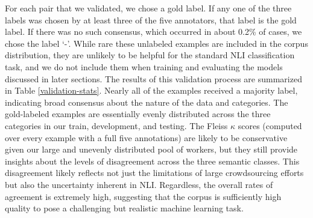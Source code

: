 For each pair that we validated, we chose a gold label. If any one of
the three labels was chosen by at least three of the five annotators,
that label is the gold label. If there was no such consensus, which
occurred in about 0.2\% of cases, we chose the label `-'. While rare these
unlabeled examples are included in the corpus distribution, they are
unlikely to be helpful for the standard NLI classification task, and
we do not include them when training and evaluating the models
discussed in later sections. The results of this validation process
are summarized in Table \ref{validation-stats}. 
Nearly all of the examples received a majority
label, indicating broad consensus about the nature of the data and
categories. The gold-labeled examples are essentially evenly
distributed across the three categories in our train, development, and
testing. The Fleiss $\kappa$ scores 
(computed over every example with a full five annotations)
are likely to be conservative given our large and
unevenly distributed pool of workers, but they still provide insights
about the levels of disagreement across the three semantic
classes. This disagreement likely reflects not just the limitations of
large crowdsourcing efforts but also the uncertainty inherent in NLI.
Regardless, the overall rates of agreement is extremely high,
suggesting that the corpus is sufficiently high quality to pose a
challenging but realistic machine learning task.


